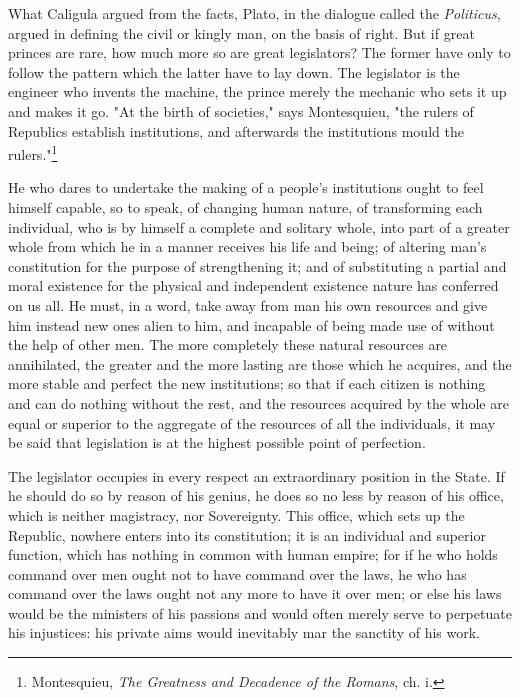 \documentclass[12pt]{report}
\begin{document}
What Caligula argued from the facts, Plato, in the dialogue called the \textit{Politicus}, argued in defining the civil or kingly man, on the basis of right. But if great princes are rare, how much more so are great legislators? The former have only to follow the pattern which the latter have to lay down. The legislator is the engineer who invents the machine, the prince merely the mechanic who sets it up and makes it go. "At the birth of societies," says Montesquieu, "the rulers of Republics establish institutions, and afterwards the institutions mould the rulers."\footnote{Montesquieu, \textit{The Greatness and Decadence of the Romans}, ch. i.}

He who dares to undertake the making of a people's institutions ought to feel himself capable, so to speak, of changing human nature, of transforming each individual, who is by himself a complete and solitary whole, into part of a greater whole from which he in a manner receives his life and being; of altering man's constitution for the purpose of strengthening it; and of substituting a partial and moral existence for the physical and independent existence nature has conferred on us all. He must, in a word, take away from man his own resources and give him instead new ones alien to him, and incapable of being made use of without the help of other men. The more completely these natural resources are annihilated, the greater and the more lasting are those which he acquires, and the more stable and perfect the new institutions; so that if each citizen is nothing and can do nothing without the rest, and the resources acquired by the whole are equal or superior to the aggregate of the resources of all the individuals, it may be said that legislation is at the highest possible point of perfection.

The legislator occupies in every respect an extraordinary position in the State. If he should do so by reason of his genius, he does so no less by reason of his office, which is neither magistracy, nor Sovereignty. This office, which sets up the Republic, nowhere enters into its constitution; it is an individual and superior function, which has nothing in common with human empire; for if he who holds command over men ought not to have command over the laws, he who has command over the laws ought not any more to have it over men; or else his laws would be the ministers of his passions and would often merely serve to perpetuate his injustices: his private aims would inevitably mar the sanctity of his work.
\end{document}
